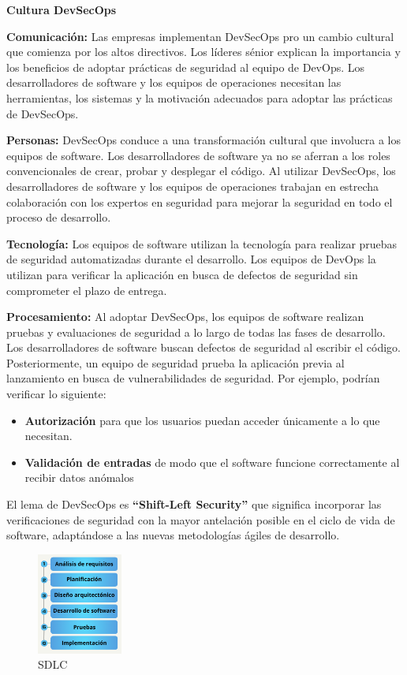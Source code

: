 \textbf{Cultura DevSecOps}

\textbf{Comunicación:} Las empresas implementan DevSecOps pro un cambio cultural que comienza por los altos directivos. Los líderes sénior explican la importancia y los beneficios de adoptar prácticas de seguridad al equipo de DevOps. Los desarrolladores de software y los equipos de operaciones necesitan las herramientas, los sistemas y la motivación adecuados para adoptar las prácticas de DevSecOps. 

\textbf{Personas:} DevSecOps conduce a una transformación cultural que involucra a los equipos de software. Los desarrolladores de software ya no se aferran a los roles convencionales de crear, probar y desplegar el código. Al utilizar DevSecOps, los desarrolladores de software y los equipos de operaciones trabajan en estrecha colaboración con los expertos en seguridad para mejorar la seguridad en todo el proceso de desarrollo. 

\textbf{Tecnología:} Los equipos de software utilizan la tecnología para realizar pruebas de seguridad automatizadas durante el desarrollo. Los equipos de DevOps la utilizan para verificar la aplicación en busca de defectos de seguridad sin comprometer el plazo de entrega. 

\textbf{Procesamiento:} Al adoptar DevSecOps, los equipos de software realizan pruebas y evaluaciones de seguridad a lo largo de todas las fases de desarrollo. Los desarrolladores de software buscan defectos de seguridad al escribir el código. Posteriormente, un equipo de seguridad prueba la aplicación previa al lanzamiento en busca de vulnerabilidades de seguridad. Por ejemplo, podrían verificar lo siguiente:
\begin{itemize}
    \item \textbf{Autorización} para que los usuarios puedan acceder únicamente a lo que necesitan.
    \item \textbf{Validación de entradas} de modo que el software funcione correctamente al recibir datos anómalos 
\end{itemize}

El lema de DevSecOps es \textbf{“Shift-Left Security”} que significa incorporar las verificaciones de seguridad con la mayor antelación posible en el ciclo de vida de software, adaptándose a las nuevas metodologías ágiles de desarrollo.\cite{aws_devsecops}

\vspace{0.3cm}

\begin{figure} %
    \centering
    \includegraphics[width=0.25\textwidth]{Imágenes/SDLC.png}
    \caption{SDLC}
    \label{fig:Ciclo_de_vida_de_desarrollo_de_softwareSDLC}
\end{figure}

